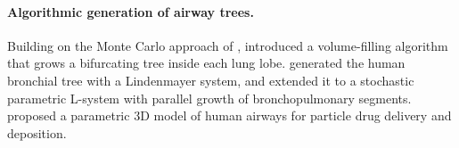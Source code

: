 
\paragraph{Algorithmic generation of airway trees.}  %
Building on the Monte Carlo approach of \citet{wang1992}, \citet{tawhai2000} introduced a
volume-filling algorithm that grows a bifurcating tree inside each lung lobe.
\citet{davoodi2016} generated the human bronchial tree with a Lindenmayer system, and
\citet{abbasi2021} extended it to a stochastic parametric L-system with parallel growth of
bronchopulmonary segments. \citet{geronzi2024} proposed a parametric 3D model of human
airways for particle drug delivery and deposition.


